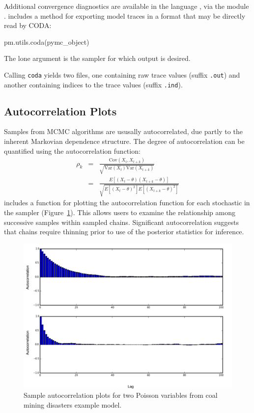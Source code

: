 \documentclass[]{jss}
\begin{document}
Additional convergence diagnostics are available in the
 language \citep{r}, via the
 module \citep{coda}.  includes a method
 for exporting model traces in a format that may be
directly read by CODA:
\begin{CodeInput}
pm.utils.coda(pymc_object)
\end{CodeInput}
The lone argument is the  sampler for which output is desired.

Calling \verb=coda= yields two files, one containing raw trace values (suffix
\verb=.out=) and another containing indices to the trace values (suffix
\verb=.ind=).


\subsection{Autocorrelation Plots} %

Samples from MCMC algorithms are ususally autocorrelated, due partly to the
inherent Markovian dependence structure. The degree of autocorrelation can
be quantified using the autocorrelation function:
\begin{eqnarray*}
    \rho_k &=& \frac{\mbox{Cov}(X_t,
X_{t+k})}{\sqrt{\mbox{Var}(X_t)\mbox{Var}(X_{t+k})}} \\
            &=& \frac{E[(X_t - \theta)(X_{t+k} - \theta)]}{\sqrt{E[(X_t -
\theta)^2] E[(X_{t+k} - \theta)^2]}}
\end{eqnarray*}
 includes a function for plotting the autocorrelation function for each
stochastic in the sampler (Figure~\ref{fig:autocorr}). This allows users
to examine the relationship among successive samples within sampled chains.
Significant autocorrelation suggests that chains require thinning prior to
use of the posterior statistics for inference.

\begin{figure}[h]
        \begin{center}
        \includegraphics[width=15cm]{autocorr.png}
    \end{center}
    \caption{Sample autocorrelation plots for two Poisson variables from
coal mining disasters example model.}
    \label{fig:autocorr}
\end{figure}
\end{document}
